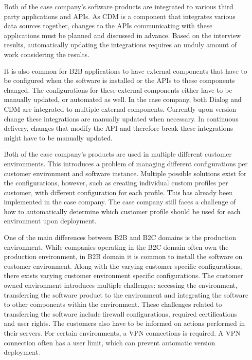 \documentclass[english, grading]{tktltiki2}
\theoremstyle{definition}
\theoremstyle{remark}
\begin{document}


Both of the case company's software products are integrated to various third party applications and APIs. As CDM is a component that integrates various data sources together, changes to the APIs communicating with these applications must be planned and discussed in advance. Based on the interview results, automatically updating the integrations requires an unduly amount of work considering the results. 

It is also common for B2B applications to have external components that have to be configured when the software is installed or the APIs to these components changed. The configurations for these external components either have to be manually updated, or automated as well. In the case company, both Dialog and CDM are integrated to multiple external components. Currently upon version change these integrations are manually updated when necessary. In continuous delivery, changes that modify the API and therefore break these integrations might have to be manually updated.

Both of the case company's products are used in multiple different customer environments. This introduces a problem of managing different configurations per customer environment and software instance. Multiple possible solutions exist for the configurations, however, such as creating individual custom profiles per customer, with different configuration for each profile. This has already been implemented in the case company. The case company still faces a challenge of how to automatically determine which customer profile should be used for each environment upon deployment.

One of the main differences between B2B and B2C domains is the production environment. While companies operating in the B2C domain often own the production environment, in B2B domain it is common to install the software on customer environment. Along with the varying customer specific configurations, there exists varying customer environment specific configurations. The customer owned environment introduces multiple challenges: accessing the environment, transferring the software product to the environment and integrating the software to other components within the environment. These challenges related to transferring the software include firewall configurations, required certifications and user rights. The customers also have to be informed on actions performed in their servers. For certain environments, a VPN connections is required. A VPN connection often has a user limit, which can prevent automatic version deployment.
\end{document}
